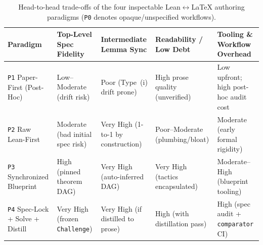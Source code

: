 \documentclass[11pt,letterpaper]{article}
\begin{document}
\begin{table}[!tbp]
\centering
\caption{Head-to-head trade-offs of the four inspectable Lean$\leftrightarrow$\LaTeX{} authoring paradigms (\texttt{P0} denotes opaque/unspecified workflows).}
\label{tab:paradigms}
\scriptsize
\setlength{\tabcolsep}{3.5pt}
\begin{tabularx}{\textwidth}{@{}>{\raggedright\arraybackslash}p{3.0cm}>{\raggedright\arraybackslash}X>{\raggedright\arraybackslash}X>{\raggedright\arraybackslash}X>{\raggedright\arraybackslash}X@{}}
\toprule
\textbf{Paradigm} & \textbf{Top-Level Spec Fidelity} & \textbf{Intermediate Lemma Sync} & \textbf{Readability / Low Debt} & \textbf{Tooling \& Workflow Overhead} \\
\midrule
\texttt{P1} Paper-First (Post-Hoc) & Low--Moderate (drift risk) & Poor (Type~(i) drift prone) & High prose quality (unverified) & Low upfront; high post-hoc audit cost \\
\texttt{P2} Raw Lean-First & Moderate (bad initial spec risk) & Very High (1-to-1 by construction) & Poor--Moderate (plumbing/bloat) & Moderate (early formal rigidity) \\
\texttt{P3} Synchronized Blueprint & High (pinned theorem DAG) & Very High (auto-inferred DAG) & Very High (tactics encapsulated) & Moderate--High (blueprint tooling) \\
\texttt{P4} Spec-Lock + Solve + Distill & Very High (frozen \texttt{Challenge}) & Very High (if distilled to prose) & High (with distillation pass) & High (spec audit + \texttt{comparator} CI) \\
\bottomrule
\end{tabularx}
\end{table}
\end{document}
